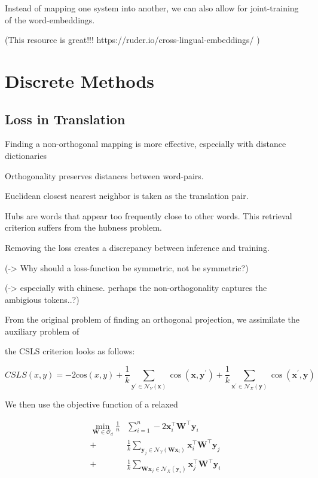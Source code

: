 \documentclass[a4paper,12pt,twoside,openright]{report}
\begin{document}
Instead of mapping one system into another, we can also allow for joint-training of the word-embeddings.

(This resource is great!!!
https://ruder.io/cross-lingual-embeddings/
)





\section{Discrete Methods }

\subsection{Loss in Translation}

Finding a non-orthogonal mapping is more effective, especially with distance dictionaries

Orthogonality preserves distances between word-pairs.

Euclidean closest nearest neighbor is taken as the translation pair.

Hubs are words that appear too frequently close to other words.
This retrieval criterion suffers from the hubness problem.

Removing the loss creates a discrepancy between inference and training.

(-> Why should a loss-function be symmetric, not be symmetric?)

(-> especially with chinese. perhaps the non-orthogonality captures the ambigious tokens..?)

From the original problem of finding an orthogonal projection, we assimilate the auxiliary problem of

the CSLS criterion looks as follows:

\begin{equation}
CSLS(x, y) = - 2 \text{cos}(x, y) + \frac{1}{k} \sum_{\mathbf{y}^{\prime} \in \mathcal{N}_{Y}(\mathbf{x})} \cos \left(\mathbf{x}, \mathbf{y}^{\prime}\right)+\frac{1}{k} \sum_{\mathbf{x}^{\prime} \in \mathcal{N}_{X}(\mathbf{y})} \cos \left(\mathbf{x}^{\prime}, \mathbf{y}\right)
\end{equation}

We then use the objective function of a relaxed 

\begin{align} 
\min _{\mathbf{W} \in \mathcal{O}_{d}} \frac{1}{n} & \sum_{i=1}^{n}-2 \mathbf{x}_{i}^{\top} \mathbf{W}^{\top} \mathbf{y}_{i} \\+& \frac{1}{k} \sum_{\mathbf{y}_{j} \in \mathcal{N}_{Y}\left(\mathbf{W} \mathbf{x}_{i}\right)} \mathbf{x}_{i}^{\top} \mathbf{W}^{\top} \mathbf{y}_{j} \\+& \frac{1}{k} \sum_{\mathbf{W} \mathbf{x}_{j} \in \mathcal{N}_{X}\left(\mathbf{y}_{i}\right)} \mathbf{x}_{j}^{\top} \mathbf{W}^{\top} \mathbf{y}_{i} 
\end{align}
\end{document}
